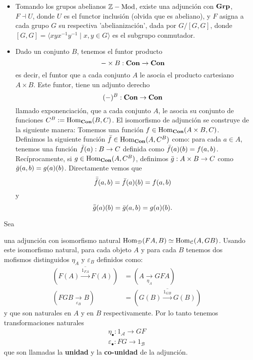 \documentclass{comunicaciones}
\begin{document}
\begin{ej}
\begin{itemize}
		\item
		Tomando los grupos abelianos $\mathbb Z-\mathrm{Mod}$, existe una adjunción con $\mathbf{Grp}$, $F\dashv U$, donde $U$ es el functor inclusión (olvida que es abeliano), y $F$ asigna a cada grupo $G$ su respectiva 'abelianización', dada por $G/[G,G]$,
		donde $[G,G]=\langle xyx^{-1}y^{-1}\mid x,y\in G\rangle$
		es el subgrupo conmutador.
		
		\item Dado un conjunto $B$, tenemos el funtor producto 
		\begin{equation*}
			{-}\times B:\mathbf{Con}\to \mathbf{Con}
		\end{equation*}
		es decir, el funtor que a cada conjunto $A$ le asocia el producto cartesiano $A\times B$. Este funtor, tiene un adjunto derecho 
		\begin{equation*}
			({-})^B:\mathbf{Con}\to \mathbf{Con}
		\end{equation*}
		llamado exponenciaci\'on, que a cada conjunto $A$, le asocia su conjunto de funciones $C^B:=\mathrm{Hom}_{\mathbf{Con}}(B,C)$. El isomorfismo de adjunci\'on se construye de la siguiente manera: Tomemos una funci\'on $f\in\mathrm{Hom}_{\mathbf{Con}}(A\times B, C)$. Definimos la siguiente funci\'on $\Bar{f}\in \mathrm{Hom}_{\mathbf{Con}}(A,C^B)$ como: para cada $a\in A$, tenemos una funci\'on $\Bar{f}(a):B\to C$ definida como $\Bar{f}(a)(b)=f(a,b)$. Rec\'iprocamente, si $g\in\mathrm{Hom}_{\mathbf{Con}}(A,C^B)$, definimos $\Bar{g}:A\times B\to C$ como $\Bar{g}(a,b)=g(a)(b)$. Directamente vemos que 
		\[\Bar{\Bar{f}}(a,b)=\Bar{f}(a)(b)=f(a,b)\]
		y 
		\[\Bar{\Bar{g}}(a)(b)=\Bar{g}(a,b)=g(a)(b).\]
	\end{itemize}
\end{ej}

\bigskip

Sea
\begin{center}
\end{center}
una adjunci\'on con isomorfismo natural $\mathrm{Hom}_\mathcal{D}(FA,B)\simeq\mathrm{Hom}_\mathcal{C}(A,GB)$. Usando este isomorfismo natural, para cada objeto $A$ y para cada $B$ tenemos dos mofismos distinguidos $\eta_A$ y $\varepsilon_B$ definidos como:
\begin{align*}
	\overline{\left(F(A)\overset{1_{FA}}{\longrightarrow}F(A)\right)} & = \left(A\underset{\eta_A}{\longrightarrow}GFA\right)\\
	\left(FGB\underset{\varepsilon_B}{\longrightarrow}B\right) & = \overline{\left(G(B)\overset{1_{GB}}{\longrightarrow}G(B)\right)}
\end{align*}
y que son naturales en $A$ y en $B$ respectivamente. Por lo tanto tenemos transformaciones naturales
\begin{align*}
	\eta_\bullet: 1_\mathcal{A}\longrightarrow GF \\
	\varepsilon_\bullet: FG\longrightarrow 1_\mathcal{B}
\end{align*}
que son llamadas la \textbf{unidad} y la \textbf{co-unidad} de la adjunción.
\end{document}
